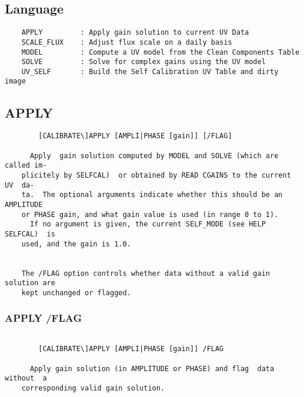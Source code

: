 \subsection{Language}
\begin{verbatim}
    APPLY         : Apply gain solution to current UV Data
    SCALE_FLUX    : Adjust flux scale on a daily basis
    MODEL         : Compute a UV model from the Clean Components Table
    SOLVE         : Solve for complex gains using the UV model
    UV_SELF       : Build the Self Calibration UV Table and dirty image

\end{verbatim}
\subsection{APPLY}
\begin{verbatim}
        [CALIBRATE\]APPLY [AMPLI|PHASE [gain]] [/FLAG]

      Apply  gain solution computed by MODEL and SOLVE (which are called im-
    plicitely by SELFCAL)  or obtained by READ CGAINS to the current UV  da-
    ta.  The optional arguments indicate whether this should be an AMPLITUDE
    or PHASE gain, and what gain value is used (in range 0 to 1).
      If no argument is given, the current SELF_MODE (see HELP  SELFCAL)  is
    used, and the gain is 1.0.


    The /FLAG option controls whether data without a valid gain solution are
    kept unchanged or flagged.

\end{verbatim}
\subsubsection{APPLY /FLAG}
\begin{verbatim}

        [CALIBRATE\]APPLY [AMPLI|PHASE [gain]] /FLAG

      Apply gain solution (in AMPLITUDE or PHASE) and flag  data  without  a
    corresponding valid gain solution.


\end{verbatim}
